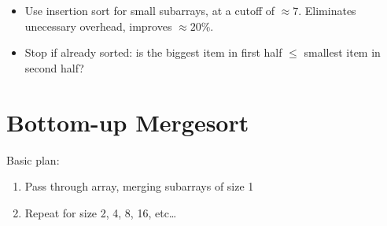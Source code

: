 \documentclass[11pt]{article}
\begin{document}
	\begin{itemize}
		\item Use insertion sort for small subarrays, at a cutoff of $\approx 7$. Eliminates unecessary overhead, improves $\approx 20\%$.
		\item Stop if already sorted: is the biggest item in first half $\leq$ smallest item in second half?
	\end{itemize}
	
\section{Bottom-up Mergesort}
	Basic plan:
		\begin{enumerate}
			\item Pass through array, merging subarrays of size 1
			\item Repeat for size 2, 4, 8, 16, etc\ldots
		\end{enumerate}
\end{document}
